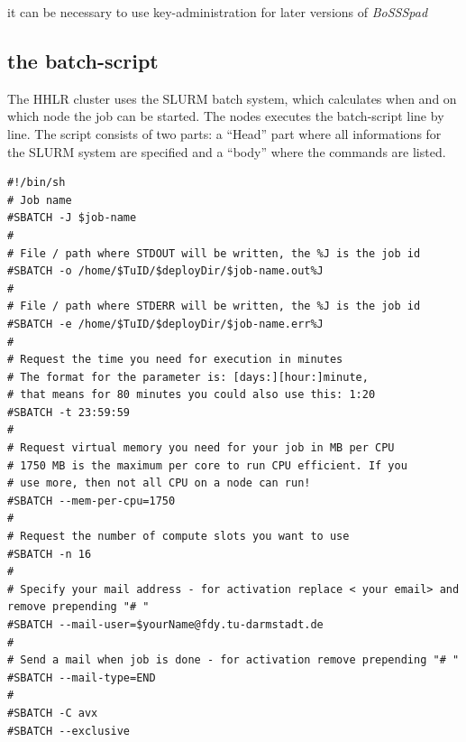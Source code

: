 \documentclass[11pt,twoside,a4paper]{fdyartcl}
\begin{document}
\begin{lstlisting}[caption={Submission over Startup string}, label={lst:bps_ws}]
\end{lstlisting}
\setcounter{BoSSSblkCounter}{-1}
\setcounter{BoSSSinblkCounter}{-1}
\renewcommand{\BoSSSbwsName}{UsingSlurmClientStartupString}


	
it can be necessary to use key-administration for later versions of \emph{BoSSSpad}

\subsection{the batch-script}
\label{sec:sbatch}

The HHLR cluster uses the SLURM batch system, which calculates when and on which node the job can be started. The nodes executes the batch-script line by line. The script consists of two parts: a ``Head'' part where all informations for the SLURM system are specified and a ``body'' where the commands are listed.\\

\noindent
\begin{minipage}{\linewidth}
\begin{lstlisting}[caption={Batch-script: head}, 
label={lst:head_batch}]
#!/bin/sh
# Job name
#SBATCH -J $job-name
#
# File / path where STDOUT will be written, the %J is the job id
#SBATCH -o /home/$TuID/$deployDir/$job-name.out%J
#
# File / path where STDERR will be written, the %J is the job id
#SBATCH -e /home/$TuID/$deployDir/$job-name.err%J
#
# Request the time you need for execution in minutes
# The format for the parameter is: [days:][hour:]minute,
# that means for 80 minutes you could also use this: 1:20
#SBATCH -t 23:59:59
#
# Request virtual memory you need for your job in MB per CPU
# 1750 MB is the maximum per core to run CPU efficient. If you
# use more, then not all CPU on a node can run!
#SBATCH --mem-per-cpu=1750
#
# Request the number of compute slots you want to use
#SBATCH -n 16
#
# Specify your mail address - for activation replace < your email> and remove prepending "# "
#SBATCH --mail-user=$yourName@fdy.tu-darmstadt.de
#
# Send a mail when job is done - for activation remove prepending "# "
#SBATCH --mail-type=END
#
#SBATCH -C avx
#SBATCH --exclusive
\end{lstlisting}

\end{minipage}
\end{document}
